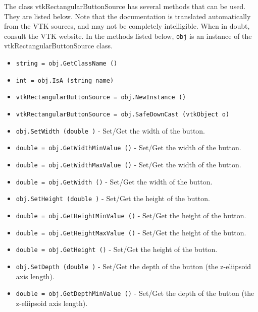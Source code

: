 The class vtkRectangularButtonSource has several methods that can be used.
  They are listed below.
Note that the documentation is translated automatically from the VTK sources,
and may not be completely intelligible.  When in doubt, consult the VTK website.
In the methods listed below, \verb|obj| is an instance of the vtkRectangularButtonSource class.
\begin{itemize}
\item  \verb|string = obj.GetClassName ()|

\item  \verb|int = obj.IsA (string name)|

\item  \verb|vtkRectangularButtonSource = obj.NewInstance ()|

\item  \verb|vtkRectangularButtonSource = obj.SafeDownCast (vtkObject o)|

\item  \verb|obj.SetWidth (double )| -  Set/Get the width of the button.

\item  \verb|double = obj.GetWidthMinValue ()| -  Set/Get the width of the button.

\item  \verb|double = obj.GetWidthMaxValue ()| -  Set/Get the width of the button.

\item  \verb|double = obj.GetWidth ()| -  Set/Get the width of the button.

\item  \verb|obj.SetHeight (double )| -  Set/Get the height of the button.

\item  \verb|double = obj.GetHeightMinValue ()| -  Set/Get the height of the button.

\item  \verb|double = obj.GetHeightMaxValue ()| -  Set/Get the height of the button.

\item  \verb|double = obj.GetHeight ()| -  Set/Get the height of the button.

\item  \verb|obj.SetDepth (double )| -  Set/Get the depth of the button (the z-eliipsoid axis length).

\item  \verb|double = obj.GetDepthMinValue ()| -  Set/Get the depth of the button (the z-eliipsoid axis length).


\end{itemize}
